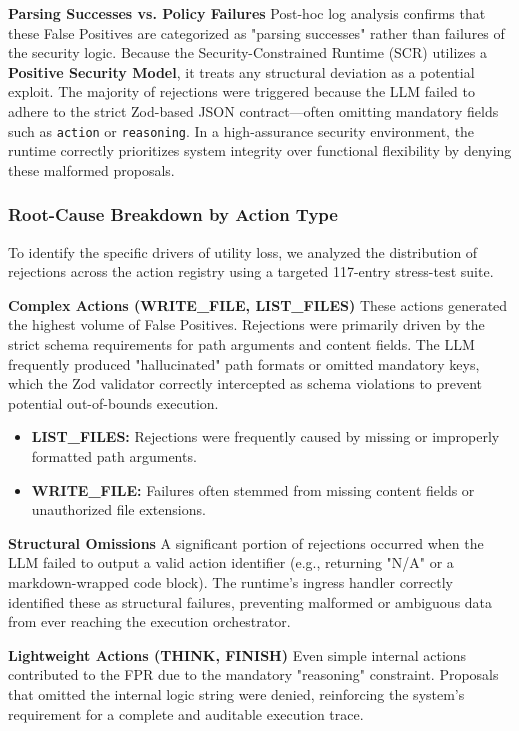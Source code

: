 \documentclass[conference]{IEEEtran}
\begin{document}
\textbf{Parsing Successes vs. Policy Failures} Post-hoc log analysis confirms that these False Positives are categorized as "parsing successes" rather than failures of the security logic. Because the Security-Constrained Runtime (SCR) utilizes a \textbf{Positive Security Model}, it treats any structural deviation as a potential exploit. The majority of rejections were triggered because the LLM failed to adhere to the strict Zod-based JSON contract—often omitting mandatory fields such as \verb|action| or \verb|reasoning|. In a high-assurance security environment, the runtime correctly prioritizes system integrity over functional flexibility by denying these malformed proposals.
 
\subsubsection{Root-Cause Breakdown by Action Type}

To identify the specific drivers of utility loss, we analyzed the distribution of rejections across the action registry using a targeted 117-entry stress-test suite.

\textbf{Complex Actions (WRITE\_FILE, LIST\_FILES)} These actions generated the highest volume of False Positives. Rejections were primarily driven by the strict schema requirements for path arguments and content fields. The LLM frequently produced "hallucinated" path formats or omitted mandatory keys, which the Zod validator correctly intercepted as schema violations to prevent potential out-of-bounds execution.

\begin{itemize}
    \item \textbf{LIST\_FILES:} Rejections were frequently caused by missing or improperly formatted path arguments.
    \item \textbf{WRITE\_FILE:} Failures often stemmed from missing content fields or unauthorized file extensions.
\end{itemize}

\textbf{Structural Omissions} A significant portion of rejections occurred when the LLM failed to output a valid action identifier (e.g., returning "N/A" or a markdown-wrapped code block). The runtime's ingress handler correctly identified these as structural failures, preventing malformed or ambiguous data from ever reaching the execution orchestrator.

\textbf{Lightweight Actions (THINK, FINISH)} Even simple internal actions contributed to the FPR due to the mandatory "reasoning" constraint. Proposals that omitted the internal logic string were denied, reinforcing the system's requirement for a complete and auditable execution trace.
\end{document}
